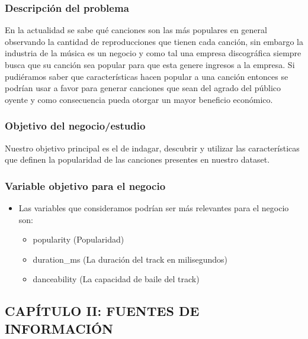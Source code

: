 \documentclass[
  letterpaper,
  DIV=11,
  numbers=noendperiod]{scrartcl}
\providecommand{\tightlist}{%
  \setlength{\itemsep}{0pt}\setlength{\parskip}{0pt}}
\begin{document}
\hypertarget{descripciuxf3n-del-problema}{%
\subsubsection{Descripción del
problema}\label{descripciuxf3n-del-problema}}

En la actualidad se sabe qué canciones son las más populares en general
observando la cantidad de reproducciones que tienen cada canción, sin
embargo la industria de la música es un negocio y como tal una empresa
discográfica siempre busca que su canción sea popular para que esta
genere ingresos a la empresa. Si pudiéramos saber que características
hacen popular a una canción entonces se podrían usar a favor para
generar canciones que sean del agrado del público oyente y como
consecuencia pueda otorgar un mayor beneficio económico.

\hypertarget{objetivo-del-negocioestudio}{%
\subsubsection{Objetivo del
negocio/estudio}\label{objetivo-del-negocioestudio}}

Nuestro objetivo principal es el de indagar, descubrir y utilizar las
características que definen la popularidad de las canciones presentes en
nuestro dataset.

\hypertarget{variable-objetivo-para-el-negocio}{%
\subsubsection{Variable objetivo para el
negocio}\label{variable-objetivo-para-el-negocio}}

\begin{itemize}
\tightlist
\item
  Las variables que consideramos podrían ser más relevantes para el
  negocio son:

  \begin{itemize}
  \tightlist
  \item
    popularity (Popularidad)
  \item
    duration\_ms (La duración del track en milisegundos)
  \item
    danceability (La capacidad de baile del track)
  \end{itemize}
\end{itemize}

\hypertarget{capuxedtulo-ii-fuentes-de-informaciuxf3n}{%
\subsection{CAPÍTULO II: FUENTES DE
INFORMACIÓN}\label{capuxedtulo-ii-fuentes-de-informaciuxf3n}}
\end{document}
